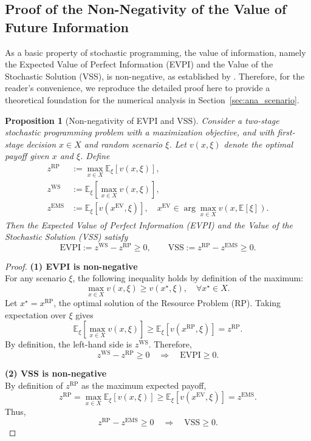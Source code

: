 \documentclass[11pt,english]{article}
\newtheorem{proposition}{Proposition}
\begin{document}
\subsection{Proof of the Non-Negativity of the Value of Future Information}
\label{appendix:stochastic}

As a basic property of stochastic programming, the value of information, namely the Expected Value of Perfect Information (EVPI) and the Value of the Stochastic Solution (VSS), is non-negative, as established by \cite{birge2011introduction}. Therefore, for the reader's convenience, we reproduce the detailed proof here to provide a theoretical foundation for the numerical analysis in Section~\ref{sec:ana_scenario}.

\begin{proposition}[Non-negativity of EVPI and VSS]
Consider a two-stage stochastic programming problem with a maximization objective, and with first-stage decision $x \in X$ and random scenario $\xi$. Let $v(x,\xi)$ denote the optimal payoff given $x$ and $\xi$. Define
\begin{align*}
    z^{\text{RP}} &:= \max_{x \in X} \mathbb{E}_\xi[v(x,\xi)], \\
    z^{\text{WS}} &:= \mathbb{E}_\xi\left[ \max_{x \in X} v(x,\xi) \right], \\
    z^{\text{EMS}} &:= \mathbb{E}_\xi[v(x^{\text{EV}},\xi)], \quad x^{\text{EV}} \in \arg\max_{x \in X} v(x,\mathbb{E}[\xi]).
\end{align*}
Then the Expected Value of Perfect Information (EVPI) and the Value of the Stochastic Solution (VSS) satisfy
$$\text{EVPI} := z^{\text{WS}} - z^{\text{RP}} \ge 0, \qquad
\text{VSS} := z^{\text{RP}} - z^{\text{EMS}} \ge 0.$$

\end{proposition}

\begin{proof}
\noindent \textbf{(1) EVPI is non-negative}\\
For any scenario $\xi$, the following inequality holds by definition of the maximum:
$$\max_{x \in X} v(x,\xi) \ge v(x^\star,\xi), \quad \forall x^\star \in X.$$
Let $x^\star = x^{\text{RP}}$, the optimal solution of the Resource Problem (RP). Taking expectation over $\xi$ gives
$$\mathbb{E}_\xi \left[ \max_{x \in X} v(x,\xi) \right] \ge \mathbb{E}_\xi [v(x^{\text{RP}},\xi)] = z^{\text{RP}}.$$
By definition, the left-hand side is $z^{\text{WS}}$. Therefore,
$$z^{\text{WS}} - z^{\text{RP}} \ge 0 \quad \Longrightarrow \quad \text{EVPI} \ge 0.$$

\noindent \textbf{(2) VSS is non-negative}\\
By definition of $z^{\text{RP}}$ as the maximum expected payoff,
$$z^{\text{RP}} = \max_{x \in X} \mathbb{E}_\xi[v(x,\xi)] \ge \mathbb{E}_\xi[v(x^{\text{EV}},\xi)] = z^{\text{EMS}}.$$
Thus,
$$z^{\text{RP}} - z^{\text{EMS}} \ge 0 \quad \Longrightarrow \quad \text{VSS} \ge 0.$$
\end{proof}
\end{document}
